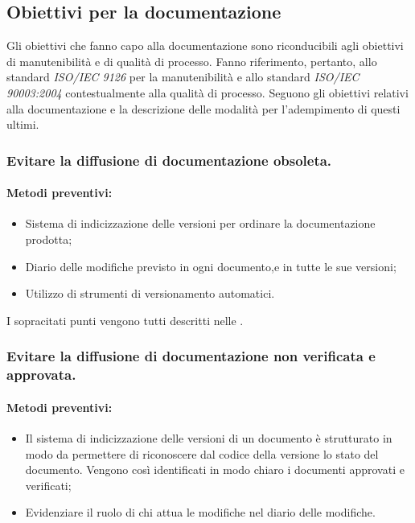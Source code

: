 \documentclass[12pt,a4paper]{article}
\begin{document}
\subsection{Obiettivi per la documentazione}
Gli obiettivi che fanno capo alla documentazione sono riconducibili agli obiettivi di manutenibilità e di qualità di processo.
Fanno riferimento, pertanto, allo standard \textit{ISO/IEC 9126} per la manutenibilità e allo standard \textit{ISO/IEC 90003:2004} contestualmente alla qualità di processo.
Seguono gli obiettivi relativi alla documentazione e la descrizione  delle modalità per l'adempimento di questi ultimi.
\subsubsection {Evitare la diffusione di documentazione obsoleta.} 
\paragraph{Metodi preventivi:}
\begin{itemize}
	\item Sistema di indicizzazione delle versioni  per ordinare la documentazione prodotta;
	\item Diario delle modifiche previsto in ogni documento,e in tutte le sue versioni;
	\item Utilizzo di strumenti di versionamento automatici.
\end{itemize}
I sopracitati punti vengono tutti descritti nelle \NdP{}.

\subsubsection{Evitare la diffusione di documentazione non verificata e approvata.}
\paragraph{Metodi preventivi:}
\begin{itemize}
	\item Il sistema di indicizzazione delle versioni di un documento è strutturato in modo da permettere di riconoscere dal codice della versione lo stato del documento. Vengono così identificati in modo chiaro i documenti approvati e verificati;
	\item Evidenziare il ruolo di chi attua le modifiche nel diario delle modifiche.
\end{itemize}
\end{document}

